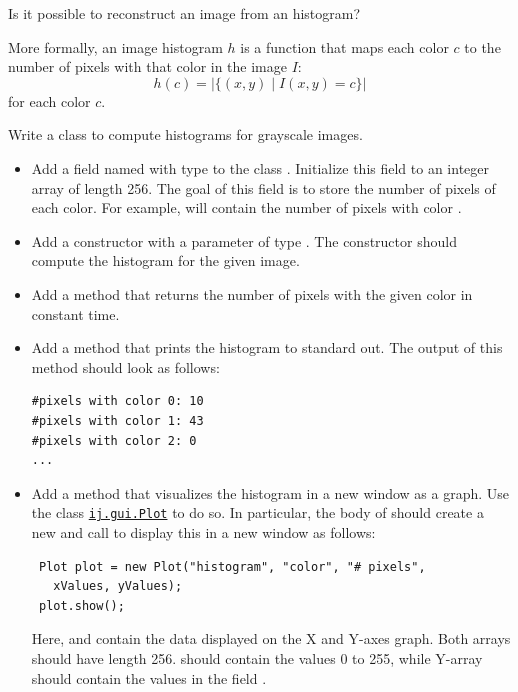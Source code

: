\documentclass{book}
\begin{document}
\begin{exercise}
Is it possible to reconstruct an image from an histogram?
\end{exercise}

More formally, an image histogram $h$ is a function that maps each color $c$ to the number of pixels with that color in the image $I$:
$$h(c) = |\{ (x, y) \mid I(x, y) = c \}|$$
for each color $c$.

\begin{exercise}\label{ex:histogram}
Write a class  to compute histograms for grayscale images.
\begin{itemize}
  \item Add a field named  with type  to the class . Initialize this field to an integer array of length 256. The goal of this field is to store the number of pixels of each color. For example,  will contain the number of pixels with color .
  \item Add a constructor with a parameter of type . The constructor should compute the histogram for the given image.
  \item Add a method  that returns the number of pixels with the given color in constant time.
  \item Add a method  that prints the histogram to standard out. The output of this method should look as follows:
\begin{verbatim}
#pixels with color 0: 10
#pixels with color 1: 43
#pixels with color 2: 0
...
\end{verbatim}
 \item Add a method  that visualizes the histogram in a new window as a graph. Use the class \href{http://rsbweb.nih.gov/ij/developer/api/ij/gui/Plot.html}{\texttt{ij.gui.Plot}} to do so. In particular, the body of  should create a new  and call  to display this  in a new window as follows: 
 \begin{lstlisting}
 Plot plot = new Plot("histogram", "color", "# pixels",
   xValues, yValues);
 plot.show();
 \end{lstlisting}
Here,  and  contain the data displayed on the X and Y-axes graph. Both arrays should have length 256.  should contain the values 0 to 255, while Y-array should contain the values in the field .
\end{itemize} 
\end{exercise}
\end{document}
